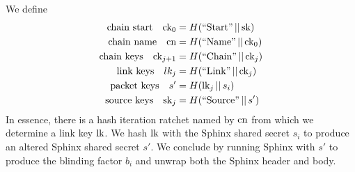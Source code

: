 \documentclass[twoside,letterpaper]{sig-alternate}
\def\mathcomma{,}
\def\mathperiod{.}
\def\mathcomma{}
\def\mathperiod{}
\begin{document}
We define
\[ \begin{aligned}
\textrm{chain start}\quad
 \ck_0 &= H(\textrm{``Start''} \,||\, \sk) \mathcomma \\
\textrm{chain name}\quad
 \cn &= H(\textrm{``Name''} \,||\, \ck_0) \mathcomma \\
\textrm{chain keys}\quad
 \ck_{j+1} &= H(\textrm{``Chain''} \,||\, \ck_j) \mathcomma \\
\textrm{link keys}\quad
 lk_j &= H(\textrm{``Link''} \,||\, \ck_j) \mathcomma \\
\textrm{packet keys}\quad 
 s' &= H(\lk_j \,||\, s_i) \mathcomma \\ %
\textrm{source keys}\quad 
 \sk_j &= H(\textrm{``Source''} \,||\, s') \mathperiod \\
\end{aligned} \]
In essence, there is a hash iteration ratchet named by $\textrm{cn}$
from which we determine a link key $\textrm{lk}$.
We hash $\textrm{lk}$ with the Sphinx shared secret $s_i$ to produce
an altered Sphinx shared secret $s'$.
We conclude by running Sphinx with $s'$ to produce the 
blinding factor $b_i$ and unwrap both the Sphinx header and body. 
\end{document}
